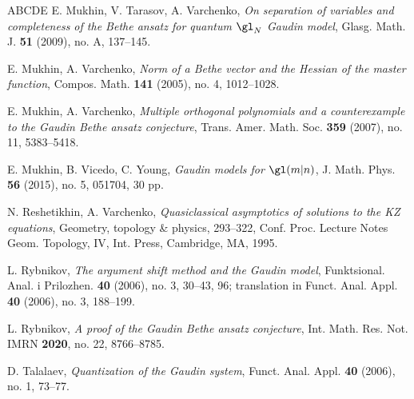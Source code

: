 \documentclass[11pt, reqno]{amsart}
\theoremstyle{definition}
\theoremstyle{remark}
\numberwithin{equation}{section}
\begin{document}
\begin{thebibliography}{ABCDE}
  E. Mukhin, V. Tarasov, A. Varchenko, \emph{On separation of variables and completeness of the Bethe ansatz for quantum $\gl_N$ Gaudin model}, Glasg. Math. J. \textbf{51} (2009), no. A, 137--145.

  E. Mukhin, A. Varchenko, \emph{Norm of a Bethe vector and the Hessian of the master function}, Compos. Math. \textbf{141} (2005), no. 4, 1012--1028.

  E. Mukhin, A. Varchenko, \emph{Multiple orthogonal polynomials and a counterexample to the Gaudin Bethe ansatz conjecture}, Trans. Amer. Math. Soc. \textbf{359} (2007), no. 11, 5383--5418.

 E. Mukhin, B. Vicedo, C. Young, \emph{Gaudin models for $\gl(m|n)$}, J. Math. Phys. \textbf{56} (2015), no. 5, 051704, 30 pp.

 N. Reshetikhin, A. Varchenko, \emph{Quasiclassical asymptotics of solutions to the KZ equations}, Geometry, topology \& physics, 293--322, Conf. Proc. Lecture Notes Geom. Topology, IV, Int. Press, Cambridge, MA, 1995.

 L. Rybnikov, \emph{The argument shift method and the Gaudin model}, Funktsional. Anal. i Prilozhen. \textbf{40} (2006), no. 3, 30--43, 96; translation in Funct. Anal. Appl. \textbf{40} (2006), no. 3, 188--199.

 L. Rybnikov, \emph{A proof of the Gaudin Bethe ansatz conjecture}, Int. Math. Res. Not. IMRN \textbf{2020}, no. 22, 8766--8785.

 D. Talalaev, \emph{Quantization of the Gaudin system}, Funct. Anal. Appl. \textbf{40} (2006), no. 1, 73--77.

\end{thebibliography}
\end{document}

